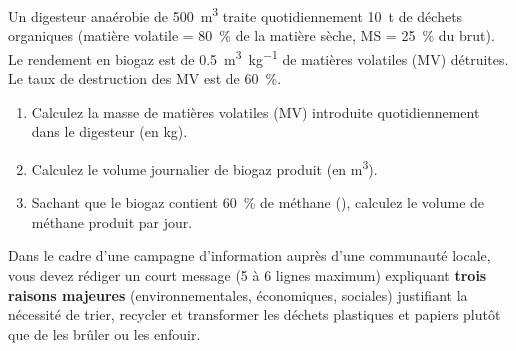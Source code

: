 \documentclass[11pt]{article}
\begin{document}
\begin{exercice}
Un digesteur anaérobie de \SI{500}{\cubic\meter} traite quotidiennement \SI{10}{\tonne} de déchets organiques (matière volatile = \SI{80}{\%} de la matière sèche, MS = \SI{25}{\%} du brut). Le rendement en biogaz est de \SI{0.5}{\cubic\meter\per\kilogram} de matières volatiles (MV) détruites. Le taux de destruction des MV est de \SI{60}{\%}.
\begin{enumerate}
    \item Calculez la masse de matières volatiles (MV) introduite quotidiennement dans le digesteur (en kg).
    \item Calculez le volume journalier de biogaz produit (en \si{\cubic\meter}).
    \item Sachant que le biogaz contient \SI{60}{\%} de méthane (), calculez le volume de méthane produit par jour.
\end{enumerate}
\end{exercice}

\begin{exercice}
Dans le cadre d'une campagne d'information auprès d'une communauté locale, vous devez rédiger un court message (5 à 6 lignes maximum) expliquant \textbf{trois raisons majeures} (environnementales, économiques, sociales) justifiant la nécessité de trier, recycler et transformer les déchets plastiques et papiers plutôt que de les brûler ou les enfouir.
\end{exercice}
\end{document}
